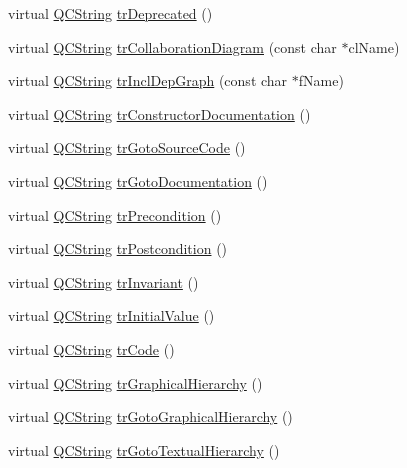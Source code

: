 \begin{DoxyCompactItemize}
virtual \hyperlink{class_q_c_string}{Q\+C\+String} \hyperlink{class_translator_czech_a3cc7540de252df6fda4327c284967124}{tr\+Deprecated} ()
\item 
virtual \hyperlink{class_q_c_string}{Q\+C\+String} \hyperlink{class_translator_czech_ad482483ef0225afa2906f3504425eb9b}{tr\+Collaboration\+Diagram} (const char $\ast$cl\+Name)
\item 
virtual \hyperlink{class_q_c_string}{Q\+C\+String} \hyperlink{class_translator_czech_a877d173d0986d9cb4d94e81530aeb339}{tr\+Incl\+Dep\+Graph} (const char $\ast$f\+Name)
\item 
virtual \hyperlink{class_q_c_string}{Q\+C\+String} \hyperlink{class_translator_czech_ac60c33613730ea0fd182a8ee10788bed}{tr\+Constructor\+Documentation} ()
\item 
virtual \hyperlink{class_q_c_string}{Q\+C\+String} \hyperlink{class_translator_czech_aa23eb58726c11b307fea1bc41e25fa05}{tr\+Goto\+Source\+Code} ()
\item 
virtual \hyperlink{class_q_c_string}{Q\+C\+String} \hyperlink{class_translator_czech_a023255d64d137b90bc2be66ade101d1e}{tr\+Goto\+Documentation} ()
\item 
virtual \hyperlink{class_q_c_string}{Q\+C\+String} \hyperlink{class_translator_czech_a30c061bb96ca53fcd82120c2e95fc0b3}{tr\+Precondition} ()
\item 
virtual \hyperlink{class_q_c_string}{Q\+C\+String} \hyperlink{class_translator_czech_add92570f81b2876cbaa356d23a6d91ab}{tr\+Postcondition} ()
\item 
virtual \hyperlink{class_q_c_string}{Q\+C\+String} \hyperlink{class_translator_czech_ae66cf0345e161c9ec12d6bf58be462d8}{tr\+Invariant} ()
\item 
virtual \hyperlink{class_q_c_string}{Q\+C\+String} \hyperlink{class_translator_czech_a9ea398360d7e755599b3db137c798cb4}{tr\+Initial\+Value} ()
\item 
virtual \hyperlink{class_q_c_string}{Q\+C\+String} \hyperlink{class_translator_czech_af2f5836910df98603882967a7673c9aa}{tr\+Code} ()
\item 
virtual \hyperlink{class_q_c_string}{Q\+C\+String} \hyperlink{class_translator_czech_a29e3ccbea020f891f65282d7eb604517}{tr\+Graphical\+Hierarchy} ()
\item 
virtual \hyperlink{class_q_c_string}{Q\+C\+String} \hyperlink{class_translator_czech_ab997607286d94f639e2cef01c0932cf4}{tr\+Goto\+Graphical\+Hierarchy} ()
\item 
virtual \hyperlink{class_q_c_string}{Q\+C\+String} \hyperlink{class_translator_czech_a25107d048eccd585ed1c967c8c4ce2ec}{tr\+Goto\+Textual\+Hierarchy} ()

\end{DoxyCompactItemize}
